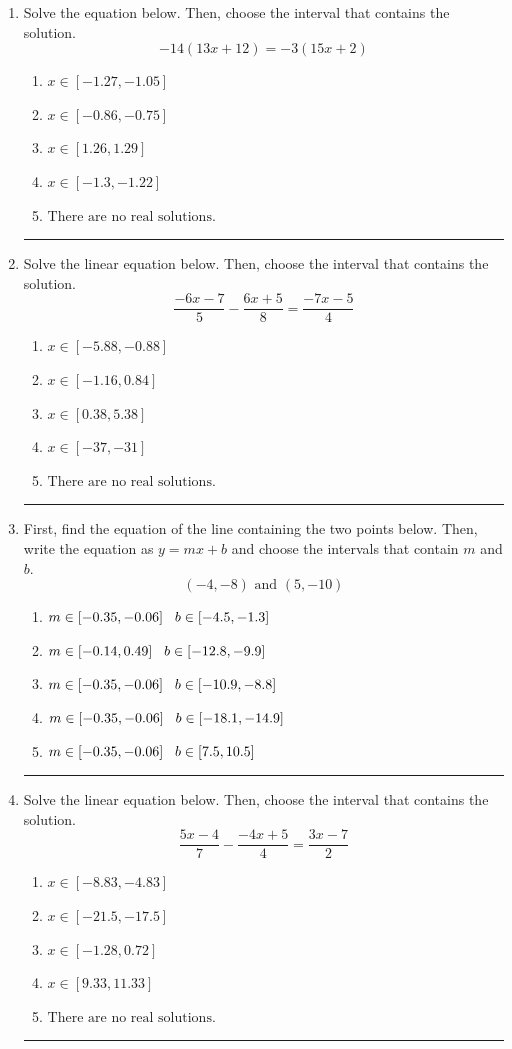 \documentclass[14pt]{extbook}
\newcommand{\litem}[1]{\item#1\hspace*{-1cm}\rule{\textwidth}{0.4pt}}
\begin{document}
\begin{enumerate}
{\begin{enumerate}[label=\Alph*.]
\end{enumerate} }
\litem{
Solve the equation below. Then, choose the interval that contains the solution.\[ -14(13x + 12) = -3(15x + 2) \]\begin{enumerate}[label=\Alph*.]
\item \( x \in [-1.27, -1.05] \)
\item \( x \in [-0.86, -0.75] \)
\item \( x \in [1.26, 1.29] \)
\item \( x \in [-1.3, -1.22] \)
\item \( \text{There are no real solutions.} \)

\end{enumerate} }
\litem{
Solve the linear equation below. Then, choose the interval that contains the solution.\[ \frac{-6x -7}{5} - \frac{6x + 5}{8} = \frac{-7x -5}{4} \]\begin{enumerate}[label=\Alph*.]
\item \( x \in [-5.88, -0.88] \)
\item \( x \in [-1.16, 0.84] \)
\item \( x \in [0.38, 5.38] \)
\item \( x \in [-37, -31] \)
\item \( \text{There are no real solutions.} \)

\end{enumerate} }
\litem{
First, find the equation of the line containing the two points below. Then, write the equation as $ y=mx+b $ and choose the intervals that contain $m$ and $b$.\[ (-4, -8) \text{ and } (5, -10) \]\begin{enumerate}[label=\Alph*.]
\item \( m \in [-0.35, -0.06] \hspace*{3mm} b \in [-4.5, -1.3] \)
\item \( m \in [-0.14, 0.49] \hspace*{3mm} b \in [-12.8, -9.9] \)
\item \( m \in [-0.35, -0.06] \hspace*{3mm} b \in [-10.9, -8.8] \)
\item \( m \in [-0.35, -0.06] \hspace*{3mm} b \in [-18.1, -14.9] \)
\item \( m \in [-0.35, -0.06] \hspace*{3mm} b \in [7.5, 10.5] \)

\end{enumerate} }
\litem{
Solve the linear equation below. Then, choose the interval that contains the solution.\[ \frac{5x -4}{7} - \frac{-4x + 5}{4} = \frac{3x -7}{2} \]\begin{enumerate}[label=\Alph*.]
\item \( x \in [-8.83, -4.83] \)
\item \( x \in [-21.5, -17.5] \)
\item \( x \in [-1.28, 0.72] \)
\item \( x \in [9.33, 11.33] \)
\item \( \text{There are no real solutions.} \)

\end{enumerate} }
\end{enumerate}
\end{document}
